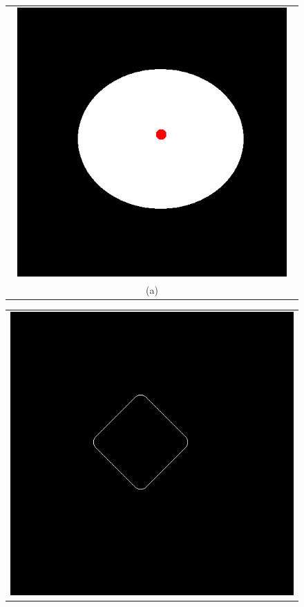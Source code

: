 \begin{figure}[h!]
\centering
\begin{minipage}{.49\textwidth}
\begin{tabular}{c}
\includegraphics[width=0.95\textwidth]{results/2D/circle} \\
(a)
\end{tabular}
\end{minipage}
\begin{minipage}{.49\textwidth}
\begin{tabular}{c}
\includegraphics[width=.9\textwidth]{results/2D/circleZero700} \\

\end{tabular}
\end{minipage}
\end{figure}
